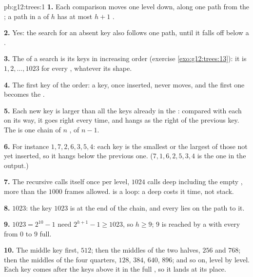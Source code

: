 \begin{solution}{pb:g12:trees:1}
\textbf{1.} Each comparison moves one level down, along one path from the ; a path in a  of  $h$ has at
most $h + 1$ .

\textbf{2.} Yes: the search for an absent key also follows one path, until it falls off below a .

\textbf{3.} The  of a search  is its keys in increasing order (exercise \ref{exo:g12:trees:13}): it is
$1, 2, \dots, 1023$ for every , whatever its shape.

\textbf{4.} The first key of the order: a key, once inserted, never moves, and the first one becomes the .

\textbf{5.} Each new key is larger than all the keys already in the : compared with each  on its way, it goes
right every time, and hangs as the right  of the previous key. The  is one chain of $n$ , of 
$n - 1$.

\textbf{6.} For instance $1, 7, 2, 6, 3, 5, 4$: each key is the smallest or the largest of those not yet inserted, so
it hangs below the previous one. ($7, 1, 6, 2, 5, 3, 4$ is the one in the output.)

\textbf{7.} The recursive  calls itself once per level, $1024$ calls deep including the empty , more
than the $1000$ frames allowed.  is a loop: a deep  costs it time, not stack.

\textbf{8.} $1023$: the key $1023$ is at the end of the chain, and every  lies on the path to it.

\textbf{9.} $1023 = 2^{10} - 1$  need $2^{h+1} - 1 \ge 1023$, so $h \ge 9$;  $9$ is reached by a  with
every  from $0$ to $9$ full.

\textbf{10.} The middle key first, $512$; then the middles of the two halves, $256$ and $768$; then the middles of the
four quarters, $128$, $384$, $640$, $896$; and so on, level by level. Each key comes after the keys above it in the
full , so it lands at its place.


\end{solution}
